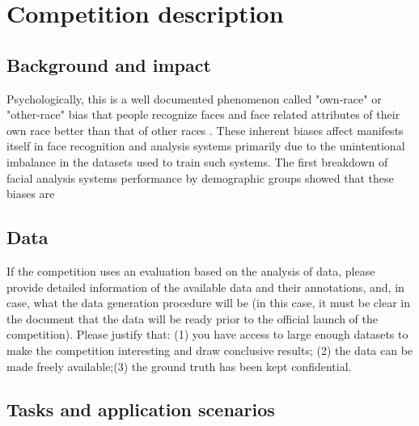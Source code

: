 \documentclass[11pt, oneside]{article}
\begin{document}
\section{Competition description}

\subsection{Background and impact}

Psychologically, this is a well documented phenomenon called "own-race" or "other-race" bias that people recognize faces and face related attributes of their own race better than that of other races \cite{furl2002face}. These inherent biases affect manifests itself in face recognition and analysis systems primarily due to the unintentional imbalance in the datasets used to train such systems. The first breakdown of facial analysis systems performance by demographic groups\cite{phillips2011other} showed that these biases are


\subsection{Data}

If the competition uses an evaluation based on the analysis of data,
please provide detailed information of the available data and
their annotations, and, in case, what the data generation
procedure will be (in this case, it must be clear in the document
that the data will be ready prior to the official launch of the
competition). Please justify that: (1) you have access to large
enough datasets to make the competition interesting and draw
conclusive
 results; (2) the data can be made freely available;(3) the ground truth has been kept confidential.

\subsection{Tasks and application scenarios}
\end{document}
